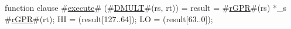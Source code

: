function clause #\hyperref[zexecute]{execute}# (#\hyperref[zDMULT]{DMULT}#(rs, rt)) =
  {
    result = #\hyperref[zrGPR]{rGPR}#(rs) *_s #\hyperref[zrGPR]{rGPR}#(rt);
    HI = (result[127..64]);
    LO = (result[63..0]);
  }
